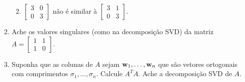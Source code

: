 \documentclass[leqno]{article}
\numberwithin{equation}{section}
\begin{document}
\begin{enumerate}
\begin{enumerate}
\begin{sol} 
\end{sol} 

\item $\begin{bmatrix}
3 & 0 \\
0 & 3
\end{bmatrix}$ não é similar à $\begin{bmatrix}
3 & 1 \\
0 & 3
\end{bmatrix}$.

\begin{sol} 
\end{sol} 

\end{enumerate}


\item Ache os valores singulares (como na decomposição SVD) da matriz $A = \begin{bmatrix}
1 & 1 \\
1 & 0
\end{bmatrix}$.

\begin{sol} 
\end{sol} 


\item Suponha que as colunas de $A$ sejam $\mathbf{w}_1, \ldots, \mathbf{w}_n$ que são vetores ortogonais com comprimentos $\sigma_1, \ldots, \sigma_n$. Calcule $A^TA$. Ache a decomposição SVD de $A$.

\begin{sol} 
\end{sol} 

\end{enumerate}
\end{document}
